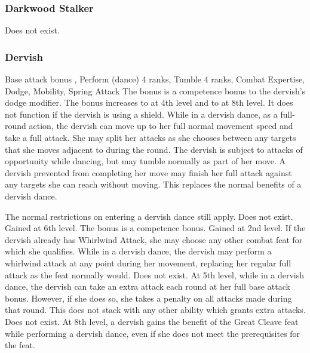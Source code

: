 \subsubsection{Darkwood Stalker}
Does not exist.
\subsubsection{Dervish}
 Base attack bonus , Perform (dance) 4 ranks, Tumble 4 ranks, Combat Expertise, Dodge, Mobility, Spring Attack
 The bonus is a competence bonus to the dervish's dodge modifier. The bonus increases to  at 4th level and to  at 8th level. It does not function if the dervish is using a shield.
 While in a dervish dance, as a full-round action, the dervish can move up to her full normal movement speed and take a full attack. She may split her attacks as she chooses between any targets that she moves adjacent to during the round. The dervish is subject to attacks of opportunity while dancing, but may tumble normally as part of her move. A dervish prevented from completing her move may finish her full attack against any targets she can reach without moving. This replaces the normal benefits of a dervish dance.
\par The normal restrictions on entering a dervish dance still apply.
 Does not exist.
 Gained at 6th level.
 The bonus is a competence bonus.
 Gained at 2nd level. If the dervish already has Whirlwind Attack, she may choose any other combat feat for which she qualifies. While in a dervish dance, the dervish may perform a whirlwind attack at any point during her movement, replacing her regular full attack as the feat normally would.
 Does not exist.
 At 5th level, while in a dervish dance, the dervish can take an extra attack each round at her full base attack bonus. However, if she does so, she takes a  penalty on all attacks made during that round. This does not stack with any other ability which grants extra attacks.
 Does not exist.
 At 8th level, a dervish gains the benefit of the Great Cleave feat while performing a dervish dance, even if she does not meet the prerequisites for the feat.
